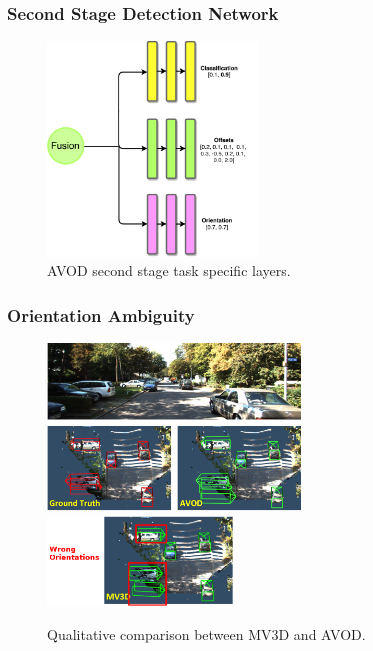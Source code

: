 \documentclass[10pt,fleqn,unknownkeysallowed]{beamer}
\begin{document}
\begin{frame}
	\frametitle{Second Stage Detection Network}
	\begin{figure}
		\begin{center}
			\includegraphics[width=0.5\textwidth]{images/pdfs/second_fusion}
			\caption{AVOD second stage task specific layers.}
		\end{center}
	\end{figure}
\end{frame}	

\begin{frame}
	\frametitle{Orientation Ambiguity}
	\begin{figure}
		\begin{center}
			\includegraphics[width=0.6\textwidth]{images/avod_detec_gt}\\
			\hspace{-1cm}
			\includegraphics[width=0.44\textwidth]{images/mv3dwrong}
			\caption{Qualitative comparison between MV3D and AVOD.}	
		\end{center}
	\end{figure}
\end{frame}
\end{document}
